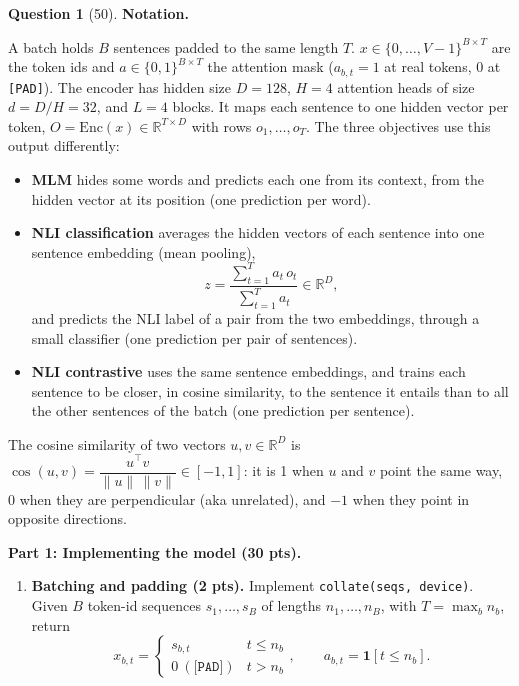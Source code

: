 \documentclass[12pt]{article}
\theoremstyle{definition}
\newtheorem{exercise}{Question}%
\begin{document}
\begin{exercise}[50]
\textbf{Notation.}

A batch holds $B$ sentences padded to the same length $T$. $x \in \{0, \dots, V-1\}^{B \times T}$ are the token ids
and $a \in \{0, 1\}^{B \times T}$ the attention mask ($a_{b,t} = 1$ at real tokens, $0$ at \texttt{[PAD]}). The
encoder has hidden size $D = 128$, $H = 4$ attention heads of size $d = D/H = 32$, and $L = 4$ blocks. It maps each
sentence to one hidden vector per token, $O = \mathrm{Enc}(x) \in \mathbb{R}^{T \times D}$ with rows
$o_1, \dots, o_T$. The three objectives use this output differently:
\begin{itemize}
  \item \textbf{MLM} hides some words and predicts each one from its context, from the hidden vector at its position
        (one prediction per word).
  \item \textbf{NLI classification} averages the hidden vectors of each sentence into one sentence embedding (mean
        pooling),
        \[
          z = \frac{\sum_{t=1}^{T} a_t\, o_t}{\sum_{t=1}^{T} a_t} \in \mathbb{R}^{D},
        \]
        and predicts the NLI label of a pair from the two embeddings, through a small classifier (one prediction per
        pair of sentences).
  \item \textbf{NLI contrastive} uses the same sentence embeddings, and trains each sentence to be closer, in cosine
        similarity, to the sentence it entails than to all the other sentences of the batch (one prediction per
        sentence).
\end{itemize}
The cosine similarity of two vectors $u, v \in \mathbb{R}^D$ is
$\cos(u, v) = \dfrac{u^\top v}{\|u\|\,\|v\|} \in [-1, 1]$: it is 1 when $u$ and $v$ point the same way, 0 when they
are perpendicular (aka unrelated), and $-1$ when they point in opposite directions.

\textbf{Part 1: Implementing the model (30 pts).}

\begin{enumerate}
  \item \textbf{Batching and padding (2 pts).} Implement \texttt{collate(seqs, device)}. Given $B$ token-id sequences
  $s_1, \dots, s_B$ of lengths $n_1, \dots, n_B$, with $T = \max_b n_b$, return
  \[
    x_{b,t} = \begin{cases} s_{b,t} & t \le n_b \\ 0 \ (\texttt{[PAD]}) & t > n_b \end{cases}, \qquad
    a_{b,t} = \mathbf{1}[t \le n_b].
  \]


\end{enumerate}
\end{exercise}
\end{document}

